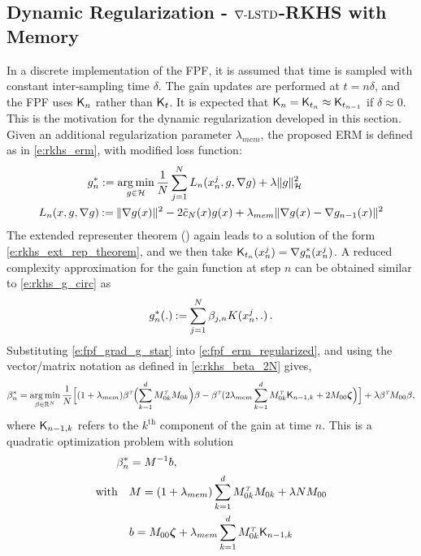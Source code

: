 \subsection{Dynamic Regularization - $\nabla\text{-LSTD}$-RKHS with Memory}
\label{s:fpf_rkhs_memory}
In a discrete implementation of the FPF, it is assumed that time is sampled with constant inter-sampling time $\delta$. The gain updates are performed at $t = n \delta$, and the FPF uses $\text{\sf K}_n$ rather than $\text{\sf K}_t$. It is expected that $\text{\sf K}_{n} = \text{\sf K}_{t_n}  \approx \text{\sf K}_{t_{n-1}}$ if $\delta\approx 0$.   This is the motivation for the dynamic regularization developed in this section.    Given an additional regularization parameter $\lambda_{mem}$,  the proposed ERM is defined as in \eqref{e:rkhs_erm},  with modified loss function:
\begin{equation}
\begin{aligned}
g^*_n & := \argmin_{g \in \clH} \frac{1}{N} \sum_{j=1}^N  L_n(x_n^j,g,\nabla g) + \lambda \|g\|^2_\clH
\\
L_n(x,g,\nabla g) &  \eqdef  \| \nabla g(x) \|^2 - 2 \tilc_N(x)g(x)  + \lambda_{mem} \|\nabla g(x) -  \nabla g_{n-1}(x)\|^2
\end{aligned}
\label{e:fpf_erm_regularized}
\end{equation}
The extended representer theorem () again leads to a solution of the form \eqref{e:rkhs_ext_rep_theorem}, and we then take
$ \text{\sf K}_{t_n}(x^j_n) = \nabla g^*_n(x^j_n)$. A reduced complexity approximation for the gain function at step $n$ can be obtained similar to \eqref{e:rkhs_g_circ} as
\begin{equation}
g^*_n(.)  \eqdef \sum_{j=1}^N \beta_{j,n} \Kern(x^j_n, . ) \, .
\label{e:fpf_grad_g_star}
\end{equation}
Substituting \eqref{e:fpf_grad_g_star} into \eqref{e:fpf_erm_regularized}, and using the vector/matrix notation as defined in \eqref{e:rkhs_beta_2N} gives,
\begin{equation}
\beta ^*_n =
\mathop{\rm arg{\,}min}_{\beta  \in \mathbb{R}^N}  \frac{1}{N} \Bigl[ (1 + \lambda_{mem}) \beta ^{\hbox{\tiny\it T}} \Bigl( \sum_{k=1}^d M_{0k}^{\hbox{\tiny\it T}} M_{0k} \Bigr) \beta  -  \beta ^{\hbox{\tiny\it T}}  ( 2 \lambda_{mem} \sum_{k=1}^d M_{0k}^{\hbox{\tiny\it T}} \text{\sf K}_{n-1,k} +2 M_{00} \boldsymbol{\zeta}  \Bigr) \Bigr] + \lambda \beta ^{\hbox{\tiny\it T}} M_{00} \beta,
\end{equation}
where $\text{\sf K}_{n-1,k}$ refers to the $k^{\text{th}}$ component of the gain at time $n$.
This is a quadratic optimization problem with solution
\begin{equation}
\begin{aligned}
\beta ^*_n  &= M^{-1} b,
\\
\text{with} \quad
&
M =  (1+ \lambda_{mem})\sum_{k=1}^d M_{0k}^\transpose M_{0k} + \lambda N M_{00}
\\
&b =  M_{00} \boldsymbol{\zeta}  + \lambda_{mem} \sum_{k =1}^d  M_{0k}^\transpose \kFPF_{n-1,k}
\end{aligned}
\label{e:fpf_beta_n}
\end{equation}

